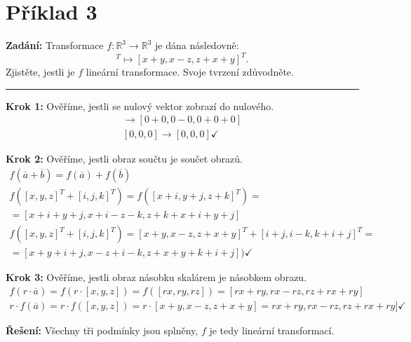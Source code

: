 \section{Příklad 3}
\textbf{Zadání:} Transformace $f: \mathbb{R}^3 \xrightarrow{} \mathbb{R}^3$ je dána následovně:
\begin{displaymath}
[x, y, z]^T \mapsto [x+y, x-z, z+x+y]^T.
\end{displaymath}
Zjistěte, jestli je $f$ lineární transformace. Svoje tvrzení zdůvodněte.
\par\noindent\rule{\textwidth}{0.4pt}

\textbf{Krok 1:} Ověříme, jestli se nulový vektor zobrazí do nulového.
\begin{gather*}
[0, 0, 0] \xrightarrow{} [0+0, 0-0, 0+0+0] \\
[0, 0, 0] \xrightarrow{} [0, 0, 0]  \checkmark
\end{gather*}

\textbf{Krok 2:} Ověříme, jestli obraz součtu je součet obrazů.
\begin{gather*}
f(\overline{a}+\overline{b}) = f(\overline{a}) + f(\overline{b})\\
f([x, y, z]^T+[i, j, k]^T) = f([x+i, y+j, z+k]^T) =\\= [x+i+y+j, x+i-z-k, z+k+x+i+y+j]\\
f([x, y, z]^T+[i, j, k]^T)=[x+y, x-z, z+x+y]^T+[i+j,i-k,k+i+j]^T =\\=[x+y+i+j, x-z+i-k, z+x+y+k+i+j])\checkmark
\end{gather*}

\textbf{Krok 3:} Ověříme, jestli obraz násobku skalárem je násobkem obrazu.
\begin{gather*}
f(r\cdot\overline{a}) = f(r\cdot[x,y,z])=f([rx, ry, rz]) = [rx+ry, rx-rz, rz+rx+ry]\\
r\cdot f(\overline{a})=r\cdot f([x,y,z])=r\cdot[x+y,x-z,z+x+y]=rx+ry,rx-rz,rz+rx+ry]\checkmark
\end{gather*}

\textbf{Řešení:} Všechny tři podmínky jsou splněny, $f$ je tedy lineární transformací.
